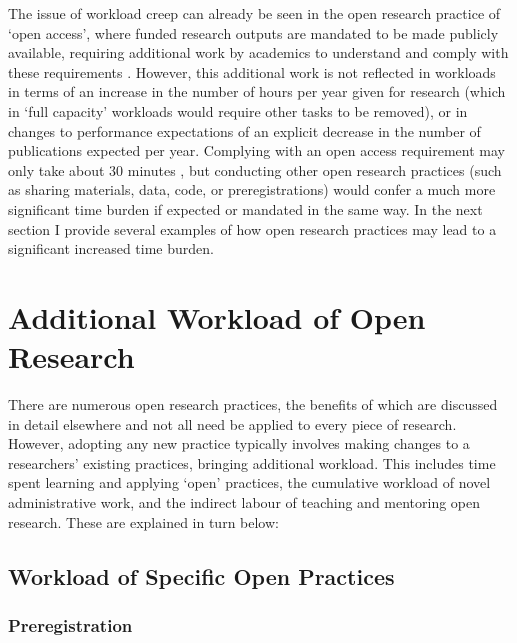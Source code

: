 \documentclass[ authordate, meta, issue]{jote-new-article}
\begin{document}
The issue of workload creep can already be seen in the open research practice of ‘open access’, where funded research outputs are mandated to be made publicly available, requiring additional work by academics to understand and comply with these requirements \parencites{ResearchConsulting2014}. However, this additional work is not reflected in workloads in terms of an increase in the number of hours per year given for research (which in ‘full capacity’ workloads would require other tasks to be removed), or in changes to performance expectations of an explicit decrease in the number of publications expected per year. Complying with an open access requirement may only take about 30 minutes \parencites{Reimer2014}, but conducting other open research practices (such as sharing materials, data, code, or preregistrations) would confer a much more significant time burden if expected or mandated in the same way. In the next section I provide several examples of how open research practices may lead to a significant increased time burden.











\section{Additional Workload of Open Research}



There are numerous open research practices, the benefits of which are discussed in detail elsewhere \parencites[e.g.][]{Munafò2017}{Nosek2018} and not all need be applied to every piece of research. However, adopting any new practice typically involves making changes to a researchers’ existing practices, bringing additional workload. This includes time spent learning and applying ‘open’ practices, the cumulative workload of novel administrative work, and the indirect labour of teaching and mentoring open research. These are explained in turn below:



\subsection{Workload of Specific Open Practices}



\subsubsection{Preregistration}
\end{document}

